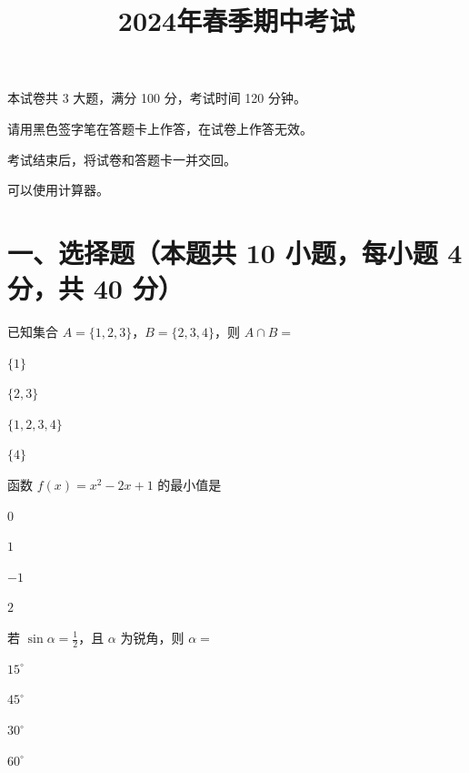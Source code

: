 \documentclass{exam-zh}
\begin{document}
\title{2024年春季期中考试}
\subject{数学}
\maketitle


\begin{notice}
  \item 本试卷共 3 大题，满分 100 分，考试时间 120 分钟。
  \item 请用黑色签字笔在答题卡上作答，在试卷上作答无效。
  \item 考试结束后，将试卷和答题卡一并交回。
  \item 可以使用计算器。
\end{notice}

\vspace{1em}

\section{一、选择题（本题共 10 小题，每小题 4 分，共 40 分）}

\begin{question}
  已知集合 $A = \{1, 2, 3\}$，$B = \{2, 3, 4\}$，则 $A \cap B = $ \paren[B]
  \begin{choices}
    \item $\{1\}$
    \item $\{2, 3\}$
    \item $\{1, 2, 3, 4\}$
    \item $\{4\}$
  \end{choices}
\end{question}

\begin{question}
  函数 $f(x) = x^2 - 2x + 1$ 的最小值是\paren[A]
  \begin{choices}
    \item $0$
    \item $1$
    \item $-1$
    \item $2$
  \end{choices}
\end{question}

\begin{question}
  若 $\sin \alpha = \frac{1}{2}$，且 $\alpha$ 为锐角，则 $\alpha = $ \paren[C]
  \begin{choices}
    \item $15^\circ$
    \item $45^\circ$
    \item $30^\circ$
    \item $60^\circ$
  \end{choices}
\end{question}
\end{document}
